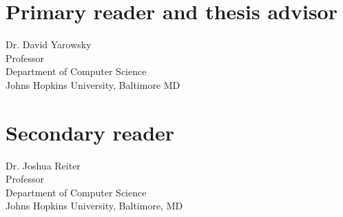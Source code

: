 \begin{singlespace}

    \section*{Primary reader and thesis advisor}
    
    Dr. David Yarowsky \\
    Professor\\
    Department of Computer Science\\
    Johns Hopkins University, Baltimore MD 

    \section*{Secondary reader}
    
    Dr. Joshua Reiter\\
    Professor\\
    Department of Computer Science \\
    Johns Hopkins University, Baltimore, MD 
    
    \vspace{0.1in}
     



\end{singlespace}